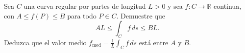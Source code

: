 Sea $C$ una curva regular por partes de longitud $L>0$ y sea $f:C\to\mathbb R$ continua, con $A\leq f(P)\leq B$ para todo $P\in C$. Demuestre que
\[
AL\leq\int_C f\,ds\leq BL.
\]
Deduzca que el valor medio $f_{\mathrm{med}}=\frac1L\int_C f\,ds$ está entre $A$ y $B$.
